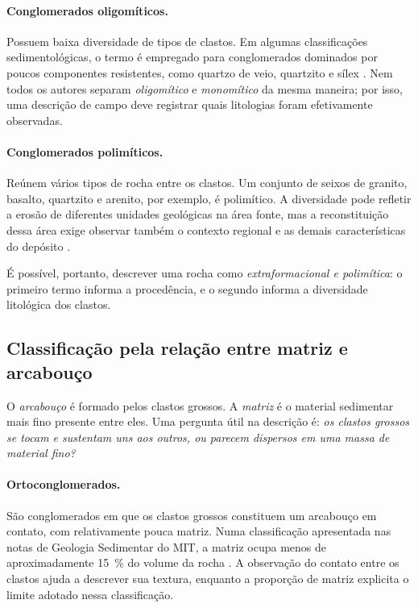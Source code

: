 \documentclass[a4paper,12pt]{article}
\theoremstyle{definition}
\theoremstyle{definition}
\theoremstyle{definition}
\begin{document}
\paragraph{Conglomerados oligomíticos.}
Possuem baixa diversidade de tipos de clastos. Em algumas
classificações sedimentológicas, o termo é empregado para
conglomerados dominados por poucos componentes resistentes,
como quartzo de veio, quartzito e sílex
\autocite{mit2007siliciclastic}. Nem todos os autores separam
\emph{oligomítico} e \emph{monomítico} da mesma maneira; por
isso, uma descrição de campo deve registrar quais litologias
foram efetivamente observadas.

\paragraph{Conglomerados polimíticos.}
Reúnem vários tipos de rocha entre os clastos. Um conjunto de
seixos de granito, basalto, quartzito e arenito, por exemplo,
é polimítico. A diversidade pode refletir a erosão de diferentes
unidades geológicas na área fonte, mas a reconstituição dessa
área exige observar também o contexto regional e as demais
características do depósito \autocite{kgsclassificacao}.

É possível, portanto, descrever uma rocha como
\emph{extraformacional e polimítica}: o primeiro termo informa a
procedência, e o segundo informa a diversidade litológica dos
clastos.

\subsection{Classificação pela relação entre matriz e arcabouço}

O \emph{arcabouço} é formado pelos clastos grossos. A \emph{matriz}
é o material sedimentar mais fino presente entre eles. Uma
pergunta útil na descrição é: \emph{os clastos grossos se tocam e
sustentam uns aos outros, ou parecem dispersos em uma massa de
material fino?}

\paragraph{Ortoconglomerados.}
São conglomerados em que os clastos grossos constituem um
arcabouço em contato, com relativamente pouca matriz. Numa
classificação apresentada nas notas de Geologia Sedimentar do
MIT, a matriz ocupa menos de aproximadamente \SI{15}{\percent}
do volume da rocha \autocite{mit2007siliciclastic}. A observação
do contato entre os clastos ajuda a descrever sua textura,
enquanto a proporção de matriz explicita o limite adotado nessa
classificação.
\end{document}
